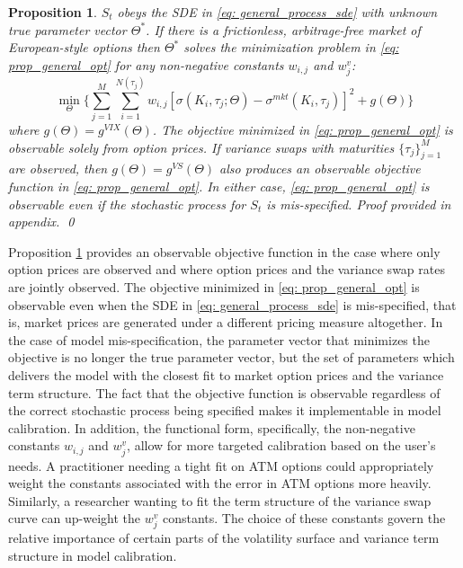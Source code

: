 \documentclass[12pt]{article}
\newtheorem{proposition}{Proposition}
\begin{document}
 \begin{proposition}\label{prop: general} 
 $S_t$ obeys the SDE in \eqref{eq: general_process_sde} with unknown true parameter vector $\Theta^*$. If there is a frictionless, arbitrage-free market of European-style options then $\Theta^*$ solves the minimization problem in \eqref{eq: prop_general_opt} for any non-negative constants $w_{i,j}$ and $w^v_j$:
\begin{equation}\label{eq: prop_general_opt}
\min\limits_{\Theta} \Bigg\lbrace \sum\limits_{j=1}^{M}\sum\limits_{i=1}^{N(\tau_j)} w_{i,j}\left[\sigma(K_i, \tau_j; \Theta) - \sigma^{mkt}(K_i, \tau_j)\right]^2 +  g(\Theta) \Bigg\rbrace 
\end{equation}
where $g(\Theta) = g^{VIX}(\Theta)$. The objective minimized in \eqref{eq: prop_general_opt} is observable solely from option prices. If variance swaps with maturities $\lbrace\tau_j\rbrace_{j=1}^{M}$ are observed, then $g(\Theta) = g^{VS}(\Theta)$ also produces an observable objective function in \eqref{eq: prop_general_opt}. In either case, \eqref{eq: prop_general_opt} is observable even if the stochastic process for $S_t$ is mis-specified. Proof provided in appendix.
\qed
\end{proposition}
Proposition \ref{prop: general} provides an observable objective function in the case where only option prices are observed and where option prices and the variance swap rates are jointly observed. The objective minimized in \eqref{eq: prop_general_opt} is observable even when the SDE in \eqref{eq: general_process_sde} is mis-specified, that is, market prices are generated under a different pricing measure altogether. In the case of model mis-specification, the parameter vector that minimizes the objective is no longer the true parameter vector, but the set of parameters which delivers the model with the closest fit to market option prices and the variance term structure. The fact that the objective function is observable regardless of the correct stochastic process being specified makes it implementable in model calibration. In addition, the functional form, specifically, the non-negative constants $w_{i,j}$ and $w_j^v$, allow for more targeted calibration based on the user's needs. A practitioner needing a tight fit on ATM options could appropriately weight the constants associated with the error in ATM options more heavily. Similarly, a researcher wanting to fit the term structure of the variance swap curve can up-weight the $w_j^v$ constants. The choice of these constants govern the relative importance of certain parts of the volatility surface and variance term structure in model calibration.
\end{document}
